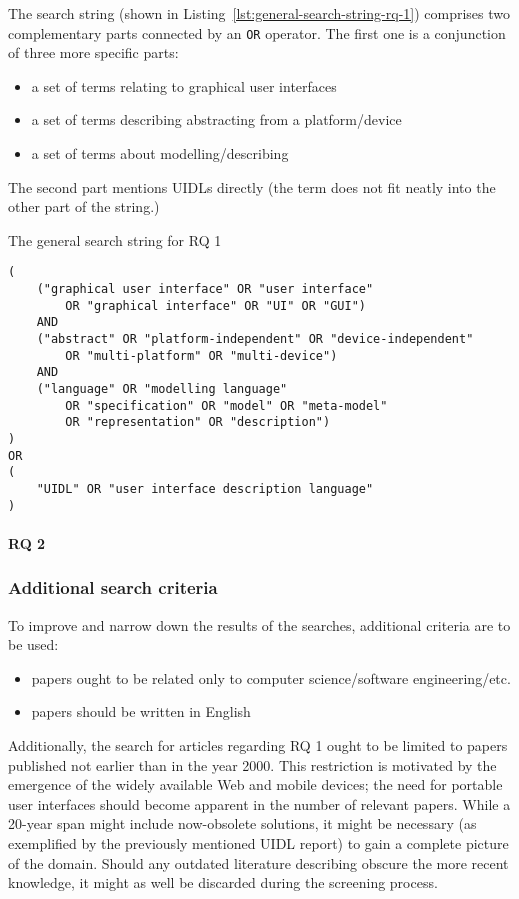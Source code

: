 The search string (shown in Listing~\ref{lst:general-search-string-rq-1})
comprises two complementary parts connected by an \texttt{OR} operator.
The first one is a conjunction of three more specific parts:
\begin{itemize}
    \item a set of terms relating to graphical user interfaces
    \item a set of terms describing abstracting from a platform/device
    \item a set of terms about modelling/describing
\end{itemize}
The second part mentions UIDLs directly (the term does not fit neatly into the other part of the string.)

\begin{listing}
    \caption{The general search string for RQ 1}
    \begin{verbatim}
(
    ("graphical user interface" OR "user interface"
        OR "graphical interface" OR "UI" OR "GUI")
    AND
    ("abstract" OR "platform-independent" OR "device-independent"
        OR "multi-platform" OR "multi-device")
    AND
    ("language" OR "modelling language"
        OR "specification" OR "model" OR "meta-model"
        OR "representation" OR "description")
)
OR
(
    "UIDL" OR "user interface description language"
)
    \end{verbatim}
    \label{lst:general-search-string-rq-1}
\end{listing}

\paragraph{RQ 2}

\subsubsection{Additional search criteria}

To improve and narrow down the results of the searches, additional criteria are to be used:
\begin{itemize}
    \item papers ought to be related only to computer science/software engineering/etc.
    \item papers should be written in English
\end{itemize}

Additionally, the search for articles regarding RQ 1 ought to be limited to papers published not earlier than in the year 2000.
This restriction is motivated by the emergence of the widely available Web and mobile devices;
the need for portable user interfaces should become apparent in the number of relevant papers.
While a 20-year span might include now-obsolete solutions, it might be necessary (as exemplified by the previously mentioned UIDL report) to gain a complete picture of the domain.
Should any outdated literature describing obscure the more recent knowledge, it might as well be discarded during the screening process.
